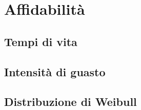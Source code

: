     \section{Affidabilità}
        \subsection{Tempi di vita}
        \subsection{Intensità di guasto}
        \subsection{Distribuzione di Weibull}
